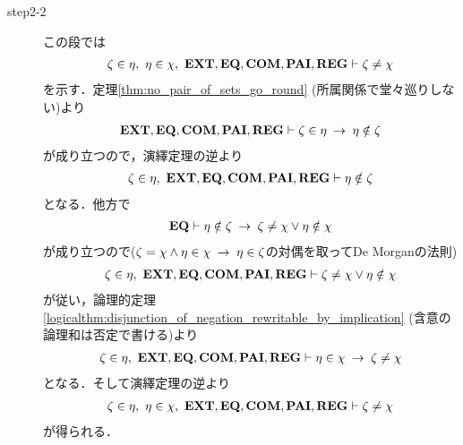 \begin{sketch}
\begin{description}
\begin{description}
					\item[step2-2] この段では
						\begin{align}
							\zeta \in \eta,\ \eta \in \chi,\ 
							\EXTAX,\EQAX,\COMAX,\PAIAX,\REGAX 
							\vdash \zeta \neq \chi
						\end{align}
						を示す．定理\ref{thm:no_pair_of_sets_go_round}
						(所属関係で堂々巡りしない)より
						\begin{align}
							\mbox{{\bf EXT}},\mbox{{\bf EQ}},\mbox{\bf COM},\mbox{{\bf PAI}},\mbox{{\bf REG}} \vdash 
							\zeta \in \eta \hspace{0.25em}\rightarrow\hspace{0.25em} \eta \notin \zeta
						\end{align}
						が成り立つので，演繹定理の逆より
						\begin{align}
							\zeta \in \eta,\ \EXTAX,\EQAX,\COMAX,\PAIAX,\REGAX 
							\vdash \eta \notin \zeta
						\end{align}
						となる．他方で
						\begin{align}
							\mbox{{\bf EQ}} \vdash \eta \notin \zeta 
							\hspace{0.25em}\rightarrow\hspace{0.25em} \zeta \neq \chi \vee \eta \notin \chi
						\end{align}
						が成り立つので($\zeta = \chi \wedge \eta \in \chi 
						\hspace{0.25em}\rightarrow\hspace{0.25em} \eta \in \zeta$の対偶を取ってDe Morganの法則)
						\begin{align}
							\zeta \in \eta,\ \EXTAX,\EQAX,\COMAX,\PAIAX,\REGAX 
							\vdash \zeta \neq \chi \vee \eta \notin \chi
						\end{align}
						が従い，論理的定理\ref{logicalthm:disjunction_of_negation_rewritable_by_implication}
						(含意の論理和は否定で書ける)より
						\begin{align}
							\zeta \in \eta,\ \EXTAX,\EQAX,\COMAX,\PAIAX,\REGAX 
							\vdash \eta \in \chi
							\rarrow \zeta \neq \chi
						\end{align}
						となる．そして演繹定理の逆より
						\begin{align}
							\zeta \in \eta,\ \eta \in \chi,\ 
							\EXTAX,\EQAX,\COMAX,\PAIAX,\REGAX 
							\vdash \zeta \neq \chi
							\label{fom:thm_transitive_totally_ordered_class_6}
						\end{align}
						が得られる．
						

\end{description}
\end{description}
\end{sketch}
